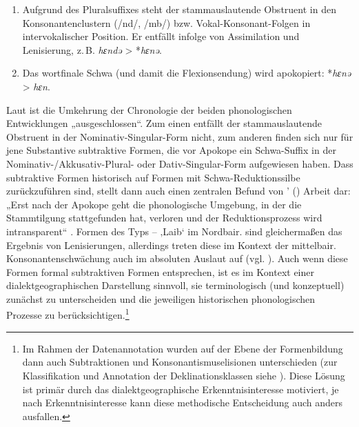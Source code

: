 \begin{enumerate}[label=(\arabic*)]
\item Aufgrund des Pluralsuffixes steht der stammauslautende Obstruent in den Konsonantenclustern (/nd/, /mb/) bzw. Vokal-Konsonant-Folgen in intervokalischer Position. Er entfällt infolge von Assimilation und Lenisierung, z.\,B. \textit{hɛndə} > *\textit{hɛnə}.
\item Das wortfinale Schwa (und damit die Flexionsendung) wird apokopiert: *\textit{hɛnə} > \textit{hɛn}.
\end{enumerate}

\begin{sloppypar}
Laut \citet[32]{Birkenes2014} ist die Umkehrung der Chronologie der beiden phonologischen Entwicklungen „ausgeschlossen“. Zum einen entfällt der stammauslautende Obstruent in der Nominativ-Singular-Form nicht, zum anderen finden sich nur für jene Substantive subtraktive Formen, die vor Apokope ein Schwa-Suffix in der Nominativ-\slash Akkusativ-Plural- oder Dativ-Singular-Form aufgewiesen haben. Dass subtraktive Formen historisch auf Formen mit Schwa-Reduktionssilbe zurückzuführen sind, stellt dann auch einen zentralen Befund von \citeauthor{Birkenes2014}' (\citeyear{Birkenes2014}) Arbeit dar: „Erst nach der Apokope geht die phonologische Umgebung, in der die Stammtilgung stattgefunden hat, verloren und der Reduktionsprozess wird intransparent“ \citep[33]{Birkenes2014}. Formen des Typs  --  ‚Laib‘ im Nordbair. sind gleichermaßen das Ergebnis von Lenisierungen, allerdings treten diese im Kontext der mittelbair. Konsonantenschwächung auch im absoluten Auslaut auf (vgl. ). Auch wenn diese Formen formal subtraktiven Formen entsprechen, ist es im Kontext einer dialektgeographischen Darstellung sinnvoll, sie terminologisch (und konzeptuell) zunächst zu unterscheiden und die jeweiligen historischen phonologischen Prozesse zu berücksichtigen.\footnote{Im Rahmen der Datenannotation wurden auf der Ebene der Formenbildung dann auch Subtraktionen und Konsonantismuselisionen unterschieden (zur Klassifikation und Annotation der Deklinationsklassen siehe ). Diese Lösung ist primär durch das dialektgeographische Erkenntnisinteresse motiviert, je nach Erkenntnisinteresse kann diese methodische Entscheidung auch anders ausfallen.}
\end{sloppypar}

